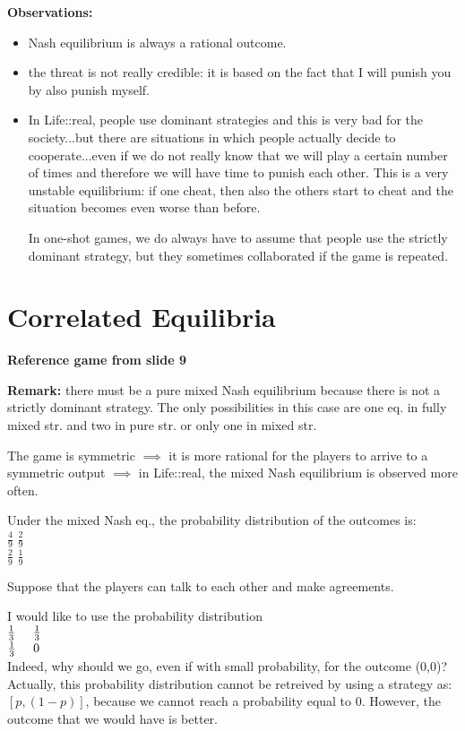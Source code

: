 \bigskip
\noindent \textbf{Observations:}
\begin{itemize}
	\item Nash equilibrium is always a rational outcome.

	\item the threat is not really credible: 
	it is based on the fact that I will punish you by also punish myself.
	
	\item In Life::real, people use dominant strategies and this is very bad 
	for the society...but there are situations in which people actually decide to 
	cooperate...even if we do not really know that we will play a certain 
	number of times and therefore we will have time to punish each other. This is 
	a very unstable equilibrium: if one cheat, then also the others start to cheat 
	and the situation becomes even worse than before.

	\noindent In one-shot games, we do always have to assume that people use the 
	strictly dominant strategy, but they sometimes collaborated if the game is 
	repeated.
\end{itemize}

\section{Correlated Equilibria}

\bigskip
\noindent \textbf{Reference game from slide 9}

\noindent \textbf{Remark:} there must be a pure mixed Nash equilibrium because 
there is not a strictly dominant strategy. The only possibilities in this case 
are one eq. in fully mixed str. and two in pure str. or only one in mixed str.

\noindent The game is symmetric $\implies$ it is more rational for the 
players to arrive to a symmetric output $\implies$ in Life::real, the mixed 
Nash equilibrium is observed more often.

\noindent Under the mixed Nash eq., the probability distribution of the 
outcomes is:\\
$\frac{4}{9}$	$\frac{2}{9}$\\
$\frac{2}{9}$	$\frac{1}{9}$

\bigskip
\noindent Suppose that the players can talk to each other and make agreements.

\noindent I would like to use the probability distribution\\
$\frac{1}{3} \hspace{.5cm} \frac{1}{3}$\\
$\frac{1}{3} \hspace{.5cm} 0$\\
Indeed, why should we 
go, even if with small probability, for the outcome (0,0)? Actually, this 
probability distribution cannot be retreived by using a strategy as: 
$[p,(1-p)]$, because we cannot reach a probability equal to 0. However, the 
outcome that we would have is better.


